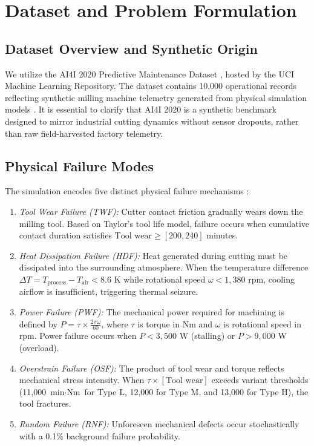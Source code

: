 \documentclass[journal,10pt,twocolumn]{IEEEtran}
\begin{document}
\section{Dataset and Problem Formulation}
\subsection{Dataset Overview and Synthetic Origin}
We utilize the AI4I 2020 Predictive Maintenance Dataset \cite{matzka2020}, hosted by the UCI Machine Learning Repository. The dataset contains 10,000 operational records reflecting synthetic milling machine telemetry generated from physical simulation models \cite{matzka2020}. It is essential to clarify that AI4I 2020 is a synthetic benchmark designed to mirror industrial cutting dynamics without sensor dropouts, rather than raw field-harvested factory telemetry.

\subsection{Physical Failure Modes}
The simulation encodes five distinct physical failure mechanisms \cite{matzka2020}:
\begin{enumerate}
    \item \emph{Tool Wear Failure (TWF):} Cutter contact friction gradually wears down the milling tool. Based on Taylor's tool life model, failure occurs when cumulative contact duration satisfies $\text{Tool wear} \ge [200, 240]$ minutes.
    \item \emph{Heat Dissipation Failure (HDF):} Heat generated during cutting must be dissipated into the surrounding atmosphere. When the temperature difference $\Delta T = T_{\text{process}} - T_{\text{air}} < 8.6\text{ K}$ while rotational speed $\omega < 1,380\text{ rpm}$, cooling airflow is insufficient, triggering thermal seizure.
    \item \emph{Power Failure (PWF):} The mechanical power required for machining is defined by $P = \tau \times \frac{2\pi\omega}{60}$, where $\tau$ is torque in Nm and $\omega$ is rotational speed in rpm. Power failure occurs when $P < 3,500\text{ W}$ (stalling) or $P > 9,000\text{ W}$ (overload).
    \item \emph{Overstrain Failure (OSF):} The product of tool wear and torque reflects mechanical stress intensity. When $\tau \times [\text{Tool wear}]$ exceeds variant thresholds (11,000 $\text{min}\cdot\text{Nm}$ for Type L, 12,000 for Type M, and 13,000 for Type H), the tool fractures.
    \item \emph{Random Failure (RNF):} Unforeseen mechanical defects occur stochastically with a 0.1\% background failure probability.
\end{enumerate}
\end{document}
